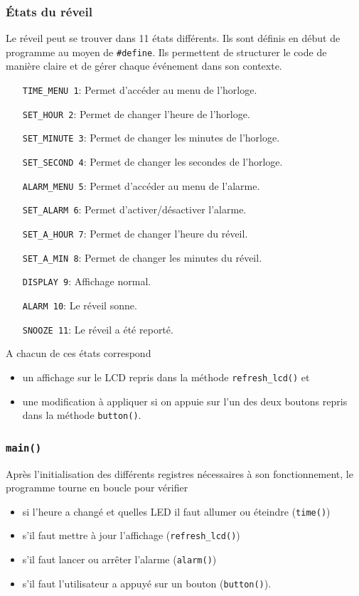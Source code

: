 \documentclass[12pt,a4paper]{article}
\begin{document}
    \subsubsection{\'Etats du réveil}
    Le réveil peut se trouver dans 11 états différents. Ils sont définis en début de programme au moyen de \texttt{\#define}. Ils permettent de structurer le code de manière claire et de gérer chaque événement dans son contexte.
    \begin{itemize}
    \item[\texttt{TIME\_MENU 1}:] Permet d'accéder au menu de l'horloge.
	\item[\texttt{SET\_HOUR 2}:] Permet de changer l'heure de l'horloge.
	\item[\texttt{SET\_MINUTE 3}:] Permet de changer les minutes de l'horloge.
	\item[\texttt{SET\_SECOND 4}:] Permet de changer les secondes de l'horloge.
	\item[\texttt{ALARM\_MENU 5}:] Permet d'accéder au menu de l'alarme.
	\item[\texttt{SET\_ALARM 6}:] Permet d'activer/désactiver l'alarme.
	\item[\texttt{SET\_A\_HOUR 7}:] Permet de changer l'heure du réveil.
	\item[\texttt{SET\_A\_MIN 8}:] Permet de changer les minutes du réveil.
	\item[\texttt{DISPLAY 9}:] Affichage normal.
	\item[\texttt{ALARM 10}:] Le réveil sonne.
	\item[\texttt{SNOOZE 11}:] Le réveil a été reporté.\\
    \end{itemize}
    
    A chacun de ces états correspond 
    \begin{itemize}
    \item un affichage sur le LCD repris dans la méthode \texttt{refresh\_lcd()} et
    \item une modification à appliquer si on appuie sur l'un des deux boutons repris dans la méthode \texttt{button()}.
    \end{itemize} 
    \subsubsection{\texttt{main()}}
    Après l'initialisation des différents registres nécessaires à son fonctionnement, le programme tourne en boucle pour vérifier
    \begin{itemize}
    \item si l'heure a changé et quelles LED il faut allumer ou éteindre (\texttt{time()})
    \item s'il faut mettre à jour l'affichage (\texttt{refresh\_lcd()})
    \item s'il faut lancer ou arrêter l'alarme (\texttt{alarm()})
    \item s'il faut l'utilisateur a appuyé sur un bouton (\texttt{button()}).
    \end{itemize}
    
\end{document}
